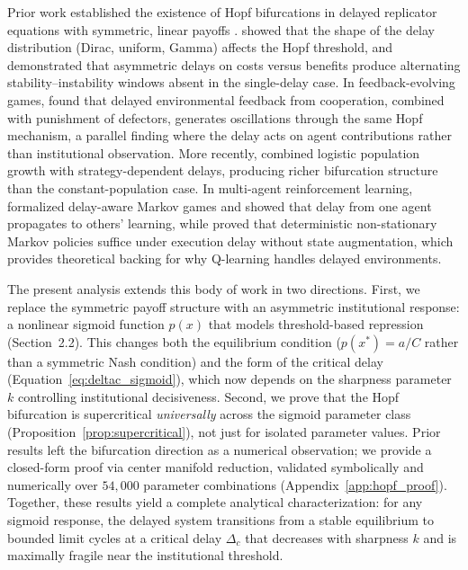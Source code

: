 Prior work established the existence of Hopf bifurcations in delayed replicator equations with symmetric, linear payoffs \citep{wesson2016hopf, wesson2016hopfRPS}. \citet{benkhalifa2018distributed} showed that the shape of the delay distribution (Dirac, uniform, Gamma) affects the Hopf threshold, and \citet{wettergren2023replicator} demonstrated that asymmetric delays on costs versus benefits produce alternating stability--instability windows absent in the single-delay case. In feedback-evolving games, \citet{yan2021cooperator} found that delayed environmental feedback from cooperation, combined with punishment of defectors, generates oscillations through the same Hopf mechanism, a parallel finding where the delay acts on agent contributions rather than institutional observation. More recently, \citet{gao2025bifurcation} combined logistic population growth with strategy-dependent delays, producing richer bifurcation structure than the constant-population case. In multi-agent reinforcement learning, \citet{chen2020delay} formalized delay-aware Markov games and showed that delay from one agent propagates to others' learning, while \citet{derman2021acting} proved that deterministic non-stationary Markov policies suffice under execution delay without state augmentation, which provides theoretical backing for why Q-learning handles delayed environments.

The present analysis extends this body of work in two directions. First, we replace the symmetric payoff structure with an asymmetric institutional response: a nonlinear sigmoid function $p(x)$ that models threshold-based repression (Section~2.2). This changes both the equilibrium condition ($p(x^*)=a/C$ rather than a symmetric Nash condition) and the form of the critical delay (Equation~\ref{eq:deltac_sigmoid}), which now depends on the sharpness parameter $k$ controlling institutional decisiveness. Second, we prove that the Hopf bifurcation is supercritical \emph{universally} across the sigmoid parameter class (Proposition~\ref{prop:supercritical}), not just for isolated parameter values. Prior results left the bifurcation direction as a numerical observation; we provide a closed-form proof via center manifold reduction, validated symbolically and numerically over $54{,}000$ parameter combinations (Appendix~\ref{app:hopf_proof}). Together, these results yield a complete analytical characterization: for any sigmoid response, the delayed system transitions from a stable equilibrium to bounded limit cycles at a critical delay $\Delta_c$ that decreases with sharpness $k$ and is maximally fragile near the institutional threshold.

